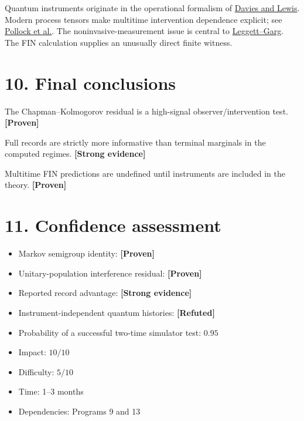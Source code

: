 \documentclass[11pt,a4paper,openany]{report}
\newcommand{\statusProven}{\textcolor{fingreen}{[Proven]}}
\newcommand{\statusStrong}{\textcolor{finblue}{[Strong evidence]}}
\newcommand{\statusRefuted}{\textcolor{finred}{[Refuted]}}
\begin{document}
Quantum instruments originate in the operational formalism of \href{https://doi.org/10.1007/BF01647093}{Davies and Lewis}. Modern process tensors make multitime intervention dependence explicit; see \href{https://doi.org/10.1103/PhysRevLett.120.040405}{Pollock et al.}. The noninvasive-measurement issue is central to \href{https://doi.org/10.1103/PhysRevLett.54.857}{Leggett–Garg}. The FIN calculation supplies an unusually direct finite witness.

\section{10. Final conclusions}

The Chapman–Kolmogorov residual is a high-signal observer/\allowbreak{}intervention test. \textbf{\statusProven{}}

Full records are strictly more informative than terminal marginals in the computed regimes. \textbf{\statusStrong{}}

Multitime FIN predictions are undefined until instruments are included in the theory. \textbf{\statusProven{}}

\section{11. Confidence assessment}

\begin{itemize}
\item 
Markov semigroup identity: \textbf{\statusProven{}}

\item 
Unitary-population interference residual: \textbf{\statusProven{}}

\item 
Reported record advantage: \textbf{\statusStrong{}}

\item 
Instrument-independent quantum histories: \textbf{\statusRefuted{}}

\item 
Probability of a successful two-time simulator test: \(0.95\)

\item 
Impact: \(10/10\)

\item 
Difficulty: \(5/10\)

\item 
Time: 1–3 months

\item 
Dependencies: Programs 9 and 13

\end{itemize}
\end{document}
